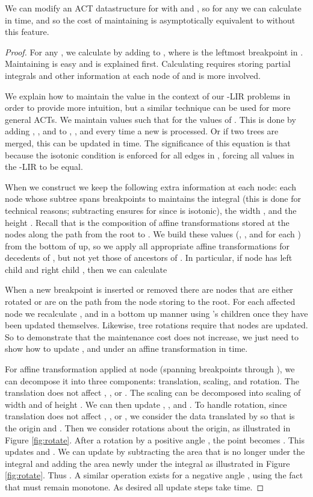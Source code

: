 \documentclass[11pt]{article}
\begin{document}
\begin{lemma} 
We can modify an ACT datastructure for   with  and , so for any  we can calculate  in  time, 
and so the cost of maintaining  is asymptotically equivalent to without this feature.
\label{lem:integrate}
\end{lemma}
\begin{proof}
For any , we calculate  by adding  to , where  is the leftmost breakpoint in .  Maintaining  is easy and is explained first.  Calculating  requires storing partial integrals and other information at each node of  and is more involved.  

We explain how to maintain the value  in the context of our -LIR problems in order to provide more intuition, but a similar technique can be used for more general ACTs.  
We maintain values  such that  for the  values of .  This is done by adding , , and  to , , and  every time a new  is processed.  Or if two trees are merged, this can be updated in  time.  The significance of this equation is that  because the isotonic condition is enforced for all edges in , forcing all values  in the -LIR to be equal.  


When we construct  we keep the following extra information at each node: 
each node  whose subtree spans breakpoints  to  maintains the integral  (this is done for technical reasons; subtracting  ensures  for  since  is isotonic), the width , and the height .  
Recall that  is the composition of affine transformations stored at the nodes along the path from the root to .  
We build these values (, , and  for each ) from the bottom of  up, so we apply all appropriate affine transformations  for decedents  of , but not yet those of ancestors of .  In particular, if node  has left child  and right child , then we can calculate 
  
When a new breakpoint  is inserted or removed there are  nodes that are either rotated or are on the path from the node storing  to the root.  For each affected node  we recalculate ,  and  in a bottom up manner using 's children once they have been updated themselves.  Likewise, tree rotations require that  nodes are updated.  So to demonstrate that the maintenance cost does not increase, we just need to show how to update ,  and  under an affine transformation  in  time.  

For affine transformation  applied at node  (spanning breakpoints  through ), we can decompose it into three components: translation, scaling, and rotation.  
The translation does not affect , , or .  
The scaling can be decomposed into scaling of width  and of height .  We can then update , , and .  
To handle rotation, since translation does not affect , , or , we consider the data translated by  so that  is the origin and .  Then we consider rotations about the origin, as illustrated in Figure \ref{fig:rotate}.  
After a rotation by a positive angle , the point  becomes .  This updates  and .  We can update  by subtracting the area  that is no longer under the integral  and adding the area  newly under the integral  as illustrated in Figure \ref{fig:rotate}.  Thus .  A similar operation exists for a negative angle , using the fact that  must remain monotone.
As desired all update steps take  time.


\end{proof}
\end{document}
